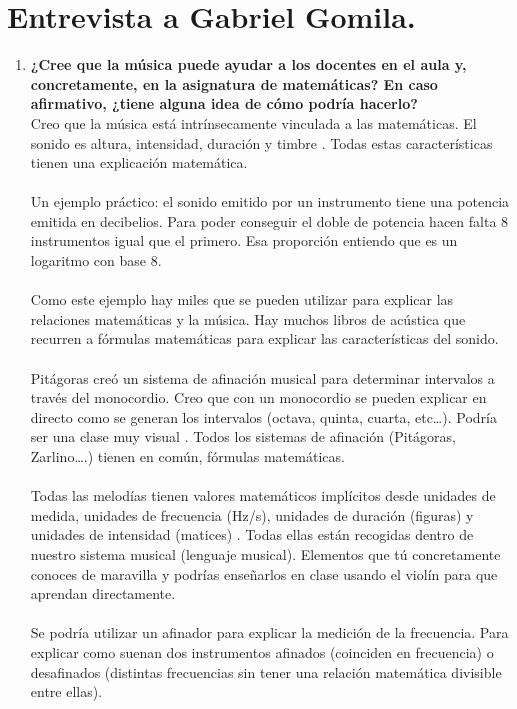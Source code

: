 \documentclass[a4paper, openright, 11pt, titlepage]{report}
\theoremstyle{definition}\newtheorem{defin}[propo]{Definition}
\theoremstyle{definition}\newtheorem{obser}[propo]{Remark}
\theoremstyle{definition}\newtheorem{ejem}[propo]{Ejemplo}
\theoremstyle{definition}\newtheorem{algoritmo}[propo]{Algoritmo}
\begin{document}
\section{Entrevista a Gabriel Gomila.}
\begin{enumerate}
    \item \textbf{¿Cree que la música puede ayudar a los docentes en el aula y, concretamente, en la asignatura de matemáticas? En caso afirmativo, ¿tiene alguna idea de cómo podría hacerlo?}\\
    Creo que la música está intrínsecamente vinculada a las matemáticas. El sonido es altura, intensidad, duración y timbre . Todas estas características tienen una explicación matemática.\\\\ 
    Un ejemplo práctico: el sonido emitido por un instrumento tiene una potencia emitida en decibelios. Para poder conseguir el doble de potencia hacen falta 8 instrumentos igual que el primero. Esa proporción entiendo que es un logaritmo con base 8.\\\\
    Como este ejemplo hay miles que se pueden utilizar para explicar las relaciones matemáticas y la música. Hay muchos libros de acústica que recurren a fórmulas matemáticas para explicar las características del sonido.\\\\
    Pitágoras creó un sistema de afinación musical para determinar intervalos a través del monocordio. Creo que con un monocordio se pueden explicar en directo como se generan los intervalos (octava, quinta, cuarta, etc…). Podría ser una clase muy visual . 
    Todos los sistemas de afinación (Pitágoras, Zarlino….) tienen en común, fórmulas matemáticas.\\\\
    Todas las melodías tienen valores matemáticos implícitos desde unidades de medida, unidades de frecuencia (Hz/s), unidades de duración (figuras) y unidades de intensidad (matices) . Todas ellas están recogidas dentro de nuestro sistema musical (lenguaje musical). Elementos que tú concretamente conoces de maravilla y podrías enseñarlos en clase usando el violín para que aprendan directamente.\\\\
    Se podría utilizar un afinador para explicar la medición de la frecuencia. Para explicar como suenan dos instrumentos afinados (coinciden en frecuencia) o desafinados (distintas frecuencias sin tener una relación matemática divisible entre ellas).

\end{enumerate}
\end{document}
